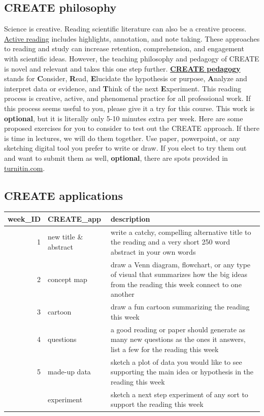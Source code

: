 \documentclass[
]{book}
\begin{document}
\hypertarget{create-philosophy}{%
\subsection*{CREATE philosophy}\label{create-philosophy}}

Science is creative. Reading scientific literature can also be a creative process. \href{https://help.open.ac.uk/active-reading}{Active reading} includes highlights, annotation, and note taking. These approaches to reading and study can increase retention, comprehension, and engagement with scientific ideas. However, the teaching philosophy and pedagogy of CREATE is novel and relevant and takes this one step further. \href{https://academic.oup.com/genetics/article/176/3/1381/6062159}{\textbf{CREATE pedagogy}} stands for \textbf{C}onsider, \textbf{R}ead, \textbf{E}lucidate the hypothesis or purpose, \textbf{A}nalyze and interpret data or evidence, and \textbf{T}hink of the next \textbf{E}xperiment. This reading process is creative, active, and phenomenal practice for all professional work. If this process seems useful to you, please give it a try for this course. This work is \textbf{optional}, but it is literally only 5-10 minutes extra per week. Here are some proposed exercises for you to consider to test out the CREATE approach. If there is time in lectures, we will do them together. Use paper, powerpoint, or any sketching digital tool you prefer to write or draw. If you elect to try them out and want to submit them as well, \textbf{optional}, there are spots provided in \href{https://turnitin.com}{turnitin.com}.

\hypertarget{create-applications}{%
\subsection*{CREATE applications}\label{create-applications}}

\begin{tabular}{rll}
\toprule
week\_ID & CREATE\_app & description\\
\midrule
1 & new title \& abstract & write a catchy, compelling alternative title to the reading and a very short 250 word abstract in your own words\\
2 & concept map & draw a Venn diagram, flowchart, or any type of visual that summarizes how the big ideas from the reading this week connect to one another\\
3 & cartoon & draw a fun cartoon summarizing the reading this week\\
4 & questions & a good reading or paper should generate as many new questions as the ones it answers, list a few for the reading this week\\
5 & made-up data & sketch a plot of data you would like to see supporting the main idea or hypothesis in the reading this week\\
\addlinespace
6 & experiment & sketch a next step experiment of any sort to support the reading this week\\
\bottomrule
\end{tabular}

  
\end{document}
